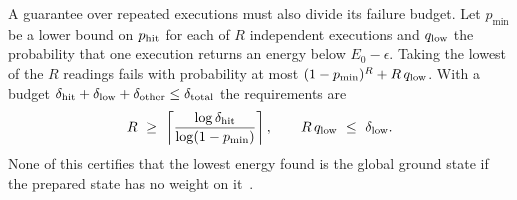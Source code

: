 \documentclass[10pt,a4paper]{article}
\begin{document}
A guarantee over repeated executions must also divide its failure budget. Let $p_{\min}$ be a lower bound on $p_{\rm hit}$ for each of $R$ independent executions and $q_{\rm low}$ the probability that one execution returns an energy below $E_0-\epsilon$. Taking the lowest of the $R$ readings fails with probability at most $(1-p_{\min})^R+R\,q_{\rm low}$. With a budget $\delta_{\rm hit}+\delta_{\rm low}+\delta_{\rm other}\le\delta_{\rm total}$ the requirements are
\begin{equation}
R\ \ge\ \left\lceil\frac{\log\delta_{\rm hit}}{\log(1-p_{\min})}\right\rceil,\qquad R\,q_{\rm low}\ \le\ \delta_{\rm low}.
\label{eq:qperep}
\end{equation}
None of this certifies that the lowest energy found is the global ground state if the prepared state has no weight on it~\cite{berry2024}.
\end{document}
